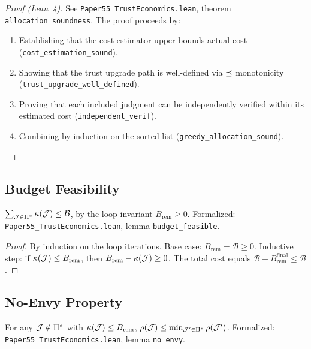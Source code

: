 \documentclass[11pt]{article}
\newcommand{\VerifBudget}{\mathcal{B}}
\newcommand{\VerifCost}{\kappa}
\newcommand{\TrustReturn}{\rho}
\begin{document}
\begin{proof}[Proof (Lean~4)]
See \texttt{Paper55\_TrustEconomics.lean}, theorem
\texttt{allocation\_soundness}.  The proof proceeds by:
\begin{enumerate}[noitemsep]
  \item Establishing that the cost estimator upper-bounds actual cost
        (\texttt{cost\_estimation\_sound}).
  \item Showing that the trust upgrade path is well-defined via
        $\preceq$ monotonicity (\texttt{trust\_upgrade\_well\_defined}).
  \item Proving that each included judgment can be independently
        verified within its estimated cost (\texttt{independent\_verif}).
  \item Combining by induction on the sorted list
        (\texttt{greedy\_allocation\_sound}).
\end{enumerate}
\end{proof}

\subsection{Budget Feasibility}

\begin{lemma}\label{lem:budget}
$\sum_{\J \in \Pi^*} \VerifCost(\J) \leq \VerifBudget$, by the loop
invariant $B_{\text{rem}} \geq 0$.  Formalized:
\texttt{Paper55\_TrustEconomics.lean}, lemma \texttt{budget\_feasible}.
\end{lemma}

\begin{proof}
By induction on the loop iterations.  Base case: $B_{\text{rem}} =
\VerifBudget \geq 0$.  Inductive step: if $\VerifCost(\J) \leq
B_{\text{rem}}$, then $B_{\text{rem}} - \VerifCost(\J) \geq 0$.
The total cost equals $\VerifBudget - B_{\text{rem}}^{\text{final}}
\leq \VerifBudget$.
\end{proof}

\subsection{No-Envy Property}

\begin{lemma}[No-Envy]\label{lem:no-envy}
For any $\mathcal{J} \notin \Pi^*$ with $\VerifCost(\J) \leq B_{\text{rem}}$,
$\TrustReturn(\J) \leq \min_{\J' \in \Pi^*} \TrustReturn(\J')$.
Formalized: \texttt{Paper55\_TrustEconomics.lean}, lemma
\texttt{no\_envy}.
\end{lemma}
\end{document}
